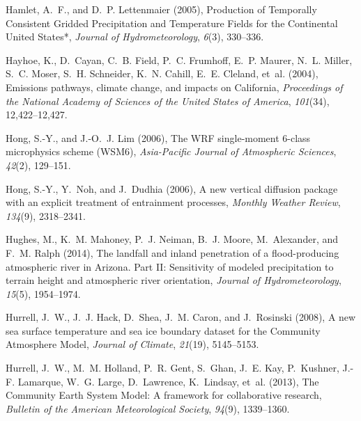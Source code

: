 \documentclass[ms,draft]{agutex}   %
\begin{document}
\begin{article}
\begin{thebibliography}{84}
Hamlet, A.~F., and D.~P. Lettenmaier (2005), {Production of Temporally
  Consistent Gridded Precipitation and Temperature Fields for the Continental
  United States*}, \textit{Journal of Hydrometeorology}, \textit{6}(3),
  330--336.

Hayhoe, K., D.~Cayan, C.~B. Field, P.~C. Frumhoff, E.~P. Maurer, N.~L. Miller,
  S.~C. Moser, S.~H. Schneider, K.~N. Cahill, E.~E. Cleland, et~al. (2004),
  {Emissions pathways, climate change, and impacts on California},
  \textit{Proceedings of the National Academy of Sciences of the United States
  of America}, \textit{101}(34), 12,422--12,427.

Hong, S.-Y., and J.-O.~J. Lim (2006), {The WRF single-moment 6-class
  microphysics scheme (WSM6)}, \textit{Asia-Pacific Journal of Atmospheric
  Sciences}, \textit{42}(2), 129--151.

Hong, S.-Y., Y.~Noh, and J.~Dudhia (2006), A new vertical diffusion package
  with an explicit treatment of entrainment processes, \textit{Monthly Weather
  Review}, \textit{134}(9), 2318--2341.

Hughes, M., K.~M. Mahoney, P.~J. Neiman, B.~J. Moore, M.~Alexander, and F.~M.
  Ralph (2014), {The landfall and inland penetration of a flood-producing
  atmospheric river in Arizona. Part II: Sensitivity of modeled precipitation
  to terrain height and atmospheric river orientation}, \textit{Journal of
  Hydrometeorology}, \textit{15}(5), 1954--1974.

Hurrell, J.~W., J.~J. Hack, D.~Shea, J.~M. Caron, and J.~Rosinski (2008), {A
  new sea surface temperature and sea ice boundary dataset for the Community
  Atmosphere Model}, \textit{Journal of Climate}, \textit{21}(19), 5145--5153.

Hurrell, J.~W., M.~M. Holland, P.~R. Gent, S.~Ghan, J.~E. Kay, P.~Kushner,
  J.-F. Lamarque, W.~G. Large, D.~Lawrence, K.~Lindsay, et~al. (2013), {The
  Community Earth System Model: A framework for collaborative research},
  \textit{Bulletin of the American Meteorological Society}, \textit{94}(9),
  1339--1360.


\end{thebibliography}
\end{article}
\end{document}

